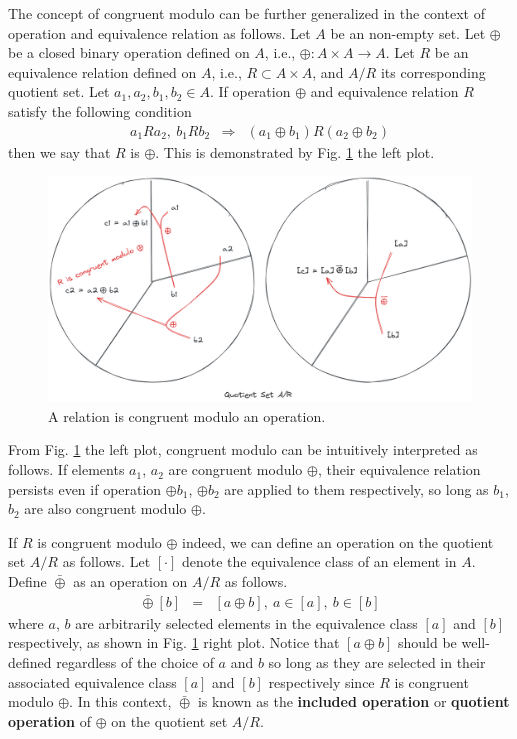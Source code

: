 The concept of congruent modulo can be further generalized in the context of operation and equivalence relation as follows. Let $A$ be an non-empty set. Let $\oplus$ be a closed binary operation defined on $A$, i.e., $\oplus: A\times A \rightarrow A$. Let $R$ be an equivalence relation defined on $A$, i.e., $R\subset A\times A$, and $A/R$ its corresponding quotient set. Let $a_1, a_2, b_1, b_2 \in A$. If operation $\oplus$ and equivalence relation $R$ satisfy the following condition
\begin{eqnarray}
	a_1Ra_2, ~b_1Rb_2 &\Rightarrow& (a_1\oplus b_1)R(a_2\oplus b_2) \label{eq:relation_congruent_modulo_operation}
\end{eqnarray}
then we say that $R$ is  $\oplus$. This is demonstrated by Fig. \ref{fig:congruent_modulo_relation} the left plot.
\begin{figure}[htbp]
	\centering
	\includegraphics[width=350pt]{chapters/abstract-algebra-basics/figures/congruent_modulo_relation.png}
	\caption{A relation is congruent modulo an operation.} \label{fig:congruent_modulo_relation}
\end{figure}
From Fig. \ref{fig:congruent_modulo_relation} the left plot, congruent modulo can be intuitively interpreted as follows. If elements $a_1$, $a_2$ are congruent modulo $\oplus$, their equivalence relation persists even if operation $\oplus b_1$, $\oplus b_2$ are applied to them respectively, so long as $b_1$, $b_2$ are also congruent modulo $\oplus$.

If $R$ is congruent modulo $\oplus$ indeed, we can define an operation on the quotient set $A/R$ as follows. Let $[\cdot]$ denote the equivalence class of an element in $A$. Define $\bar{\oplus}$ as an operation on $A/R$ as follows.
\begin{eqnarray}
	[a] \bar{\oplus} [b] &=& [a\oplus b], ~a\in[a], ~b\in [b] \label{eq:quotient_set_operation}
\end{eqnarray}
where $a$, $b$ are arbitrarily selected elements in the equivalence class $[a]$ and $[b]$ respectively, as shown in Fig. \ref{fig:congruent_modulo_relation} right plot. Notice that $[a\oplus b]$ should be well-defined regardless of the choice of $a$ and $b$ so long as they are selected in their associated equivalence class $[a]$ and $[b]$ respectively since $R$ is congruent modulo $\oplus$. In this context, $\bar{\oplus}$ is known as the \textbf{included operation} or \textbf{quotient operation} of $\oplus$ on the quotient set $A/R$.

